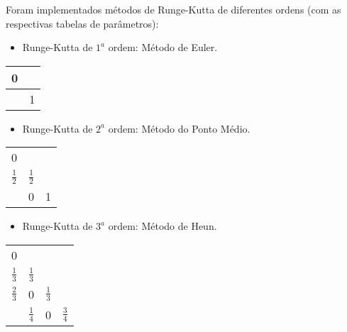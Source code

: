 \documentclass[final,5p]{elsarticle}
\numberwithin{equation}{section}
\begin{document}
    Foram implementados métodos de Runge-Kutta de diferentes ordens (com as respectivas tabelas de parâmetros):

    \begin{itemize}
        \item Runge-Kutta de $1^a$ ordem: Método de Euler.
    \end{itemize}
    \hspace{2em}
    \begin{tabular}{c|c}
        0 &  \\
        \hline
          & 1    \\
    \end{tabular}
    \bigskip

    \begin{itemize}
        \item Runge-Kutta de $2^a$ ordem: Método do Ponto Médio.
    \end{itemize}
    \hspace{2em}
    \renewcommand{\arraystretch}{1.2}
    \begin{tabular}{c|cc}
        0            &               &   \\
       $\frac{1}{2}$ & $\frac{1}{2}$ &   \\
       \hline
                     & 0             & 1 \\
    \end{tabular}
    \bigskip

    \begin{itemize}
        \item Runge-Kutta de $3^a$ ordem: Método de Heun.
    \end{itemize}
    \hspace{2em}
    \renewcommand{\arraystretch}{1.2}
    \begin{tabular}{c|ccc}
        0             &               &               & \\
        $\frac{1}{3}$ & $\frac{1}{3}$ &               & \\
        $\frac{2}{3}$ & 0             & $\frac{1}{3}$ & \\
        \hline
                      & $\frac{1}{4}$ & 0             & $\frac{3}{4}$  \\
    \end{tabular}
    \bigskip
\end{document}
